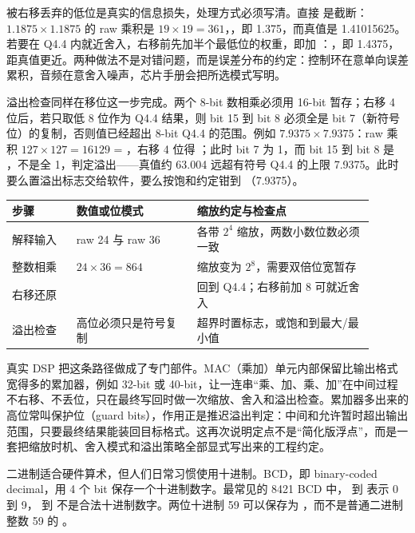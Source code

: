 被右移丢弃的低位是真实的信息损失，处理方式必须写清。直接  是截断：$1.1875 \times 1.1875$ 的 raw 乘积是 $19 \times 19 = 361$，，即 1.375，而真值是 1.41015625。若要在 Q4.4 内就近舍入，右移前先加半个最低位的权重，即加 ：，即 1.4375，距真值更近。两种做法不是对错问题，而是误差分布的约定：控制环在意单向误差累积，音频在意舍入噪声，芯片手册会把所选模式写明。

溢出检查同样在移位这一步完成。两个 8-bit 数相乘必须用 16-bit 暂存；右移 4 位后，若只取低 8 位作为 Q4.4 结果，则 bit 15 到 bit 8 必须全是 bit 7（新符号位）的复制，否则值已经超出 8-bit Q4.4 的范围。例如 $7.9375 \times 7.9375$：raw 乘积 $127 \times 127 = 16129$ = ，右移 4 位得 ；此时 bit 7 为 1，而 bit 15 到 bit 8 是 ，不是全 1，判定溢出——真值约 63.004 远超有符号 Q4.4 的上限 7.9375。此时要么置溢出标志交给软件，要么按饱和约定钳到 （7.9375）。

\begin{longtable}{L{0.16\linewidth}L{0.3\linewidth}L{0.44\linewidth}}
\toprule
步骤 & 数值或位模式 & 缩放约定与检查点 \\
\midrule
解释输入 & raw 24 与 raw 36 & 各带 $2^{4}$ 缩放，两数小数位数必须一致 \\
整数相乘 & $24 \times 36 = 864$ & 缩放变为 $2^{8}$，需要双倍位宽暂存 \\
右移还原 &  & 回到 Q4.4；右移前加 8 可就近舍入 \\
溢出检查 & 高位必须只是符号复制 & 超界时置标志，或饱和到最大/最小值 \\
\bottomrule
\end{longtable}

真实 DSP 把这条路径做成了专门部件。MAC（乘加）单元内部保留比输出格式宽得多的累加器，例如 32-bit 或 40-bit，让一连串“乘、加、乘、加”在中间过程不右移、不丢位，只在最终写回时做一次缩放、舍入和溢出检查。累加器多出来的高位常叫保护位（guard bits），作用正是推迟溢出判定：中间和允许暂时超出输出范围，只要最终结果能装回目标格式。这再次说明定点不是“简化版浮点”，而是一套把缩放时机、舍入模式和溢出策略全部显式写出来的工程约定。

二进制适合硬件算术，但人们日常习惯使用十进制。BCD，即 binary-coded decimal，用 4 个 bit 保存一个十进制数字。最常见的 8421 BCD 中， 到  表示 0 到 9， 到  不是合法十进制数字。两位十进制 59 可以保存为 ，而不是普通二进制整数 59 的 。

